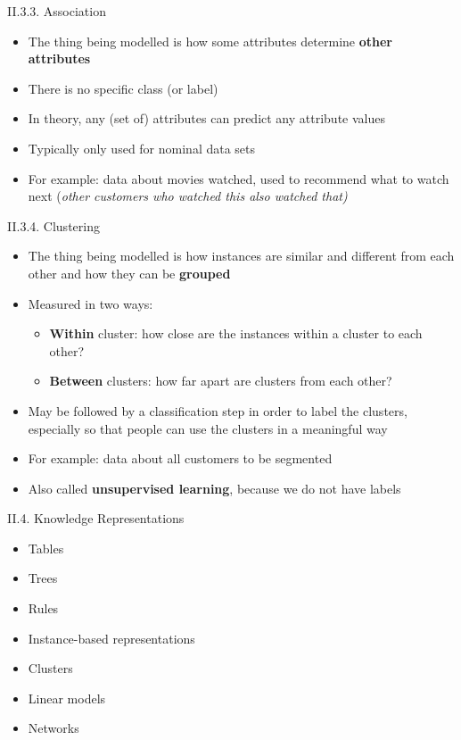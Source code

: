 \documentclass[handout]{beamer}
\newcommand{\strong}[1]{\textbf{\color{teal} #1}}
\begin{document}
\begin{frame}{II.3.3. Association}
\begin{itemize}
\item The thing being modelled is how some attributes determine \strong{other attributes}
\item There is no specific class (or label)
\item In theory, any (set of) attributes can predict any attribute values
\item Typically only used for nominal data sets
\item For example: data about movies watched, used to recommend what to watch next (\textit{other customers who watched this also watched that)}
\end{itemize}
\end{frame}
\begin{frame}{II.3.4. Clustering}
\begin{itemize}
\item The thing being modelled is how instances are similar and different from each other and how they can be \strong{grouped}
\item Measured in two ways:
	\begin{itemize}
	\item \strong{Within} cluster: how close are the instances within a cluster to each other?
	\item \strong{Between} clusters: how far apart are clusters from each other?
	\end{itemize}
\item May be followed by a classification step in order to label the clusters, especially so that people can use the clusters in a meaningful way
\item For example: data about all customers to be segmented
\item Also called \strong{unsupervised learning}, because we do not have labels
\end{itemize}
\end{frame}
\begin{frame}{II.4. Knowledge Representations}
\begin{itemize}
\item[1.] Tables
\item[2.] Trees
\item[3.] Rules
\item[4.] Instance-based representations
\item[5.] Clusters
\item[6.] Linear models
\item[7.] Networks
\end{itemize}
\end{frame}
\end{document}
